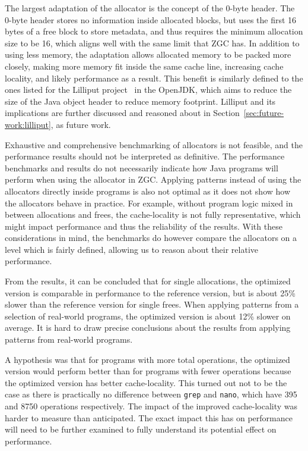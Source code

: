 
The largest adaptation of the allocator is the concept of the 0-byte header. The 0-byte header stores no information inside allocated blocks, but uses the first 16 bytes of a free block to store metadata, and thus requires the minimum allocation size to be 16, which aligns well with the same limit that ZGC has. In addition to using less memory, the adaptation allows allocated memory to be packed more closely, making more memory fit inside the same cache line, increasing cache locality, and likely performance as a result. This benefit is similarly defined to the ones listed for the Lilliput project~\cite{lilliput} in the OpenJDK, which aims to reduce the size of the Java object header to reduce memory footprint. Lilliput and its implications are further discussed and reasoned about in Section~\ref{sec:future-work:lilliput}, as future work.

Exhaustive and comprehensive benchmarking of allocators is not feasible, and the performance results should not be interpreted as definitive. The performance benchmarks and results do not necessarily indicate how Java programs will perform when using the allocator in ZGC. Applying patterns instead of using the allocators directly inside programs is also not optimal as it does not show how the allocators behave in practice. For example, without program logic mixed in between allocations and frees, the cache-locality is not fully representative, which might impact performance and thus the reliability of the results. With these considerations in mind, the benchmarks do however compare the allocators on a level which is fairly defined, allowing us to reason about their relative performance. 

From the results, it can be concluded that for single allocations, the optimized version is comparable in performance to the reference version, but is about 25\% slower than the reference version for single frees. When applying patterns from a selection of real-world programs, the optimized version is about 12\% slower on average. It is hard to draw precise conclusions about the results from applying patterns from real-world programs. 

A hypothesis was that for programs with more total operations, the optimized version would perform better than for programs with fewer operations because the optimized version has better cache-locality. This turned out not to be the case as there is practically no difference between \texttt{grep} and \texttt{nano}, which have 395 and 8750 operations respectively. The impact of the improved cache-locality was harder to measure than anticipated. The exact impact this has on performance will need to be further examined to fully understand its potential effect on performance.

